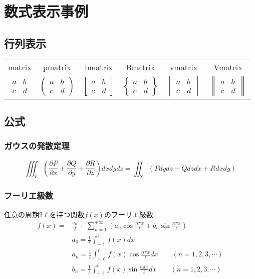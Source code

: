 \documentclass[a4paper,10pt]{jsarticle}
\begin{document}
\pagebreak
\section{数式表示事例}
\subsection{行列表示}
\begin{tabular}{cccccc}
matrix & pmatrix & bmatrix & Bmatrix & vmatrix & Vmatrix \\
$\begin{matrix}a & b \\ c & d \end{matrix}$
&
$\begin{pmatrix}a & b \\ c & d \end{pmatrix}$
&
$\begin{bmatrix}a & b \\ c & d \end{bmatrix}$
&
$\begin{Bmatrix}a & b \\ c & d \end{Bmatrix}$
&
$\begin{vmatrix}a & b \\ c & d \end{vmatrix}$
&
$\begin{Vmatrix}a & b \\ c & d \end{Vmatrix}$
\\
\end{tabular}



\subsection{公式}
\subsubsection{ガウスの発散定理}
\begin{equation}
\iiint_V\left(\frac{\partial P}{\partial x}+\frac{\partial Q}{\partial y}+\frac{\partial R}{\partial z}\right)dx dy dz
=\iint_S(P dy dz+Q dz dx+R dx dy)
\end{equation}


\subsubsection{フーリエ級数}
任意の周期$2\ell$を持つ関数$f(x)$のフーリエ級数
\begin{align}
f(x)=&\frac{a_0}{2}+\sum_{n=1}^{+\infty}\left(a_n\cos\frac{n\pi x}{\ell}+b_n\sin\frac{n\pi x}{\ell}\right) \\
&a_0=\frac{1}{\ell}\int_{-\ell}^{\ell}f(x) dx \\
&a_n=\frac{1}{\ell}\int_{-\ell}^{\ell}f(x)\cos\frac{n\pi x}{\ell}dx \qquad (n=1,2,3, \cdots) \\
&b_n=\frac{1}{\ell}\int_{-\ell}^{\ell}f(x)\sin\frac{n\pi x}{\ell}dx \qquad (n=1,2,3, \cdots)
\end{align}
\end{document}
